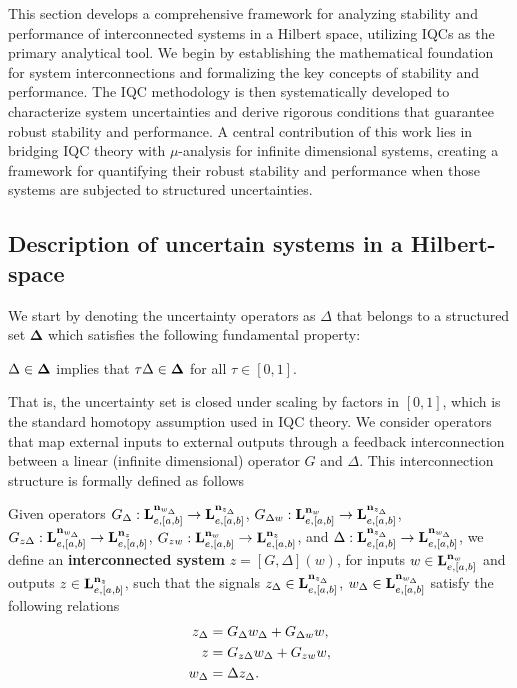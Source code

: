This section develops a comprehensive framework for analyzing stability and performance of interconnected systems in a Hilbert space, utilizing IQCs as the primary analytical tool. We begin by establishing the mathematical foundation for system interconnections and formalizing the key concepts of stability and performance. The IQC methodology is then systematically developed to characterize system uncertainties and derive rigorous conditions that guarantee robust stability and performance. A central contribution of this work lies in bridging IQC theory with $\mu$-analysis for infinite dimensional systems, creating a framework for quantifying their robust stability and performance when those systems are subjected to structured uncertainties.
\subsection{Description of uncertain systems in a Hilbert-space}
We start by denoting the uncertainty operators as $\Delta$ that belongs to a structured set $\mathbf{\Delta}$ which satisfies the following fundamental property:
\begin{assumption}
	$\Delta\in\mathbf{\Delta}$ implies that $\tau\Delta\in\mathbf{\Delta}$ for all $\tau \in [0,1]$.
\end{assumption}
That is, the uncertainty set is closed under scaling by factors in $[0,1]$, which is the standard homotopy assumption used in IQC theory. We consider operators that map external inputs to external outputs through a feedback interconnection between a linear (infinite dimensional) operator $G$ and $\Delta$. This interconnection structure is formally defined as follows
\begin{definition}\label{def1}
	Given operators $G_\Delta : \mathbf{L}_{e,[a,b]}^{\mathbf{n}_{w_\Delta}} \to \mathbf{L}_{e,[a,b]}^{\mathbf{n}_{z_\Delta}}$, $G_{\Delta w} : \mathbf{L}_{e,[a,b]}^{\mathbf{n}_{w}} \to \mathbf{L}_{e,[a,b]}^{\mathbf{n}_{z_\Delta}}$, $G_{z\Delta} :\mathbf{L}_{e,[a,b]}^{\mathbf{n}_{w_\Delta}} \to \mathbf{L}_{e,[a,b]}^{\mathbf{n}_{z}}$, $G_{zw} :\mathbf{L}_{e,[a,b]}^{\mathbf{n}_{w}} \to \mathbf{L}_{e,[a,b]}^{\mathbf{n}_{z}}$, and $\Delta : \mathbf{L}_{e,[a,b]}^{\mathbf{n}_{z_\Delta}} \to \mathbf{L}_{e,[a,b]}^{\mathbf{n}_{w_\Delta}}$, we define an \textbf{interconnected system} $z = [G,\Delta] (w)$, for inputs $w \in \mathbf{L}_{e,[a,b]}^{\mathbf{n}_{w}}$ and outputs $z\in \mathbf{L}_{e,[a,b]}^{\mathbf{n}_{z}}$, such that the signals $z_\Delta \in \mathbf{L}_{e,[a,b]}^{\mathbf{n}_{z_\Delta}}$, $w_\Delta \in \mathbf{L}_{e,[a,b]}^{\mathbf{n}_{w_\Delta}}$ satisfy the following relations
	\begin{align}\label{eq:mappingOp}
		z_\Delta & = G_\Delta w_\Delta + G_{\Delta w} w, \\ \notag
		z        & = G_{z\Delta} w_\Delta + G_{zw} w,    \\
		w_\Delta & = \Delta z_\Delta. \notag
	\end{align}
\end{definition}

